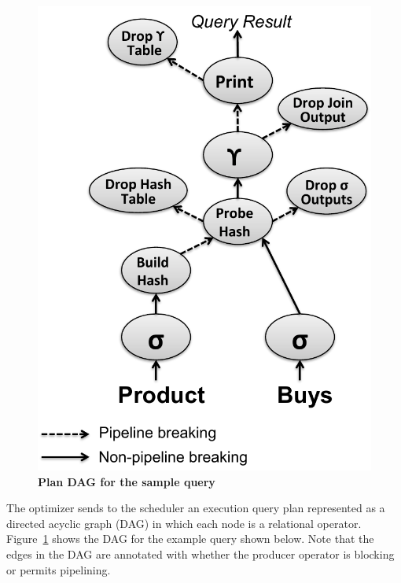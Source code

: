\begin{figure}
\centering
   \includegraphics[width=.35\textheight]{system/figures/physical-plan.pdf}
   \caption{\textbf{Plan DAG for the sample query}}
   \label{fig-dag}
\end{figure}

The optimizer sends to the scheduler an execution query plan represented as a directed acyclic graph (DAG) in which each node is a relational operator. Figure~\ref{fig-dag} shows the DAG for the example query shown below. Note that the edges in the DAG are annotated with whether the producer operator is blocking or permits pipelining.


